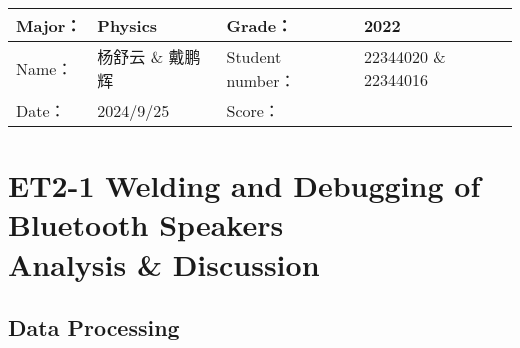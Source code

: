 
\begin{table}
	\renewcommand\arraystretch{1.7}
	\begin{tabularx}{\textwidth}{|X|X|X|X|}
		\hline
		Major：& Physics &Grade：& 2022\\
		\hline
		Name： & 杨舒云 \& 戴鹏辉 & Student number：& 22344020 \& 22344016\\
		\hline
		Date：& 2024/9/25 & Score： &\\
		\hline
	\end{tabularx}
\end{table}
\section{ET2-1 Welding and Debugging of Bluetooth Speakers \\ Analysis \& Discussion}


\subsection{Data Processing}

